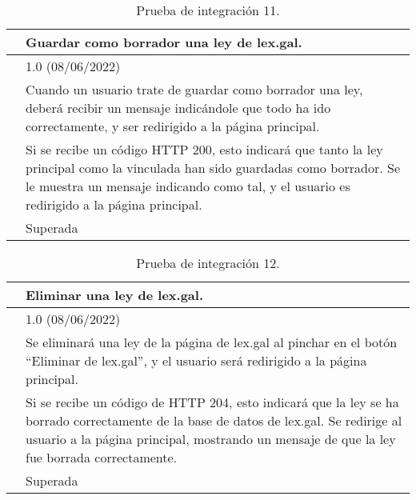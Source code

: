 \begin{table}[H]
\begin{center}
\begin{tabular}{|p{3cm}|p{10cm}|} \hline
\centering {\bf PI-11} & Guardar como borrador una ley de lex.gal.  \\ \hline\hline
\centering {\bf Versión} & 1.0 (08/06/2022) \\ \hline
\centering {\bf Descripción} & Cuando un usuario trate de guardar como borrador una ley, deberá recibir un mensaje indicándole que todo ha ido correctamente, y ser redirigido a la página principal. \\ \hline
\centering {\bf Criterio de aceptación} & Si se recibe un código HTTP 200, esto indicará que tanto la ley principal como la vinculada han sido guardadas como borrador. Se le muestra un mensaje indicando como tal, y el usuario es redirigido a la página principal. \\ \hline
\centering {\bf Estado} & Superada \\ \hline
\end{tabular}
\caption{Prueba de integración 11.}
\label{enlacePI11}
\end{center}
\end{table}

\begin{table}[H]
\begin{center}
\begin{tabular}{|p{3cm}|p{10cm}|} \hline
\centering {\bf PI-12} & Eliminar una ley de lex.gal.  \\ \hline\hline
\centering {\bf Versión} & 1.0 (08/06/2022) \\ \hline
\centering {\bf Descripción} & Se eliminará una ley de la página de lex.gal al pinchar en el botón ``Eliminar de lex.gal'', y el usuario será redirigido a la página principal. \\ \hline
\centering {\bf Criterio de aceptación} & Si se recibe un código de HTTP 204, esto indicará que la ley se ha borrado correctamente de la base de datos de lex.gal. Se redirige al usuario a la página principal, mostrando un mensaje de que la ley fue borrada correctamente. \\ \hline
\centering {\bf Estado} & Superada \\ \hline
\end{tabular}
\caption{Prueba de integración 12.}
\label{enlacePI12}
\end{center}
\end{table}

